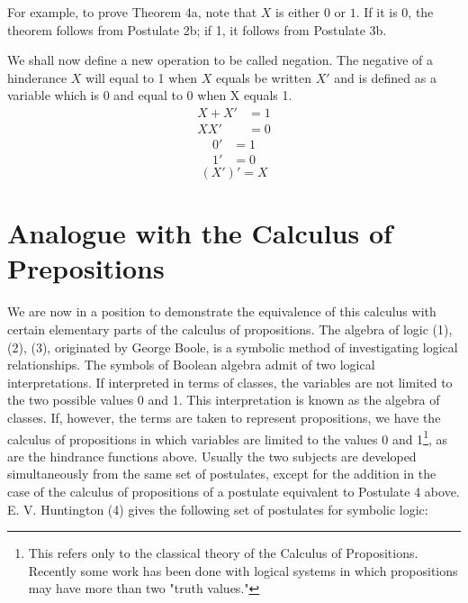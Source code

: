 \documentclass[12pt,oneside,letterpaper]{scrbook}
\begin{document}
		For example, to prove Theorem 4a, note that $X$ is either $0$ or $1$. If it is $0$, the theorem follows from Postulate 2b; if 1, it follows from Postulate 3b.

		We shall now define a new operation to be called negation. The negative of a hinderance $X$ will equal to 1 when $X$ equals be written $X'$ and is defined as a variable which is 0 and equal to 0 when X equals 1.
		\begin{subequations}
			\begin{align}
				X + X' &= 1 \\
				XX' &= 0
			\end{align}
		\end{subequations}
		\begin{subequations}
			\begin{align}
				0' &=1  \\
				1' &=0
			\end{align}
		\end{subequations}
		\begin{equation}
			(X')' = X
		\end{equation}

		\section{Analogue with the Calculus of Prepositions}
		We are now in a position to demonstrate the equivalence of this calculus with certain elementary parts of the calculus of propositions. The algebra of logic (1), (2), (3), originated by George Boole, is a symbolic method of investigating logical relationships. The symbols of Boolean algebra admit of two logical interpretations. If interpreted in terms of classes, the variables are not limited to the two possible values 0 and 1. This interpretation is known as the algebra of classes. If, however, the terms are taken to represent propositions, we have the calculus of propositions in which variables are limited to the values 0 and 1\footnote{This refers only to the classical theory of the Calculus of Propositions. Recently some work has been done with logical systems in which propositions may have more than two "truth values."}, as are the hindrance functions above. Usually the two subjects are developed simultaneously from the same set of postulates, except for the addition in the case of the calculus of propositions of a postulate equivalent to Postulate 4 above. E. V. Huntington (4) gives the following set of postulates for symbolic logic:
\end{document}
